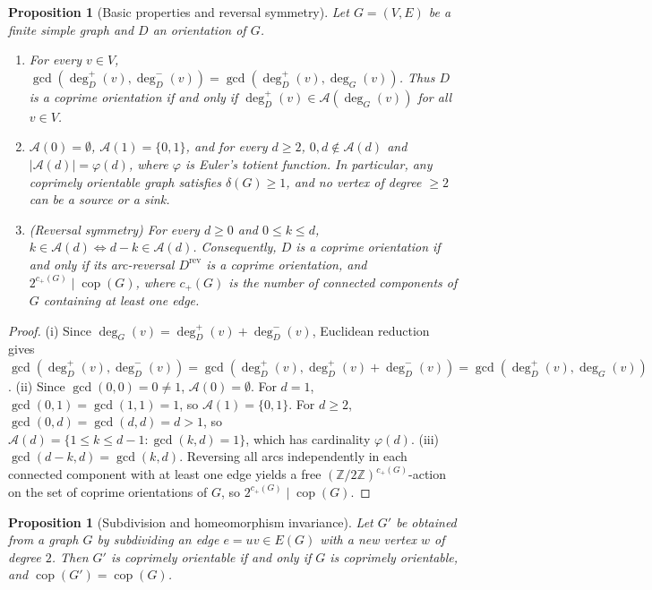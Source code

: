 \documentclass[11pt,a4paper]{article}
\newtheorem{proposition}[theorem]{Proposition}
\theoremstyle{definition}
\theoremstyle{remark}
\newcommand{\Z}{\mathbb{Z}}
\newcommand{\cop}{\operatorname{cop}}
\newcommand{\outdeg}{\deg^{+}}
\newcommand{\indeg}{\deg^{-}}
\newcommand{\Aset}{\mathcal{A}}
\begin{document}
\begin{proposition}[Basic properties and reversal symmetry]\label{prop:basic}
Let $G = (V, E)$ be a finite simple graph and $D$ an orientation of $G$.
\begin{enumerate}[label=(\roman*)]
  \item For every $v \in V$, $\gcd(\outdeg_D(v), \indeg_D(v)) = \gcd(\outdeg_D(v), \deg_G(v))$. Thus $D$ is a coprime orientation if and only if $\outdeg_D(v) \in \Aset(\deg_G(v))$ for all $v \in V$.
  \item $\Aset(0) = \emptyset$, $\Aset(1) = \{0, 1\}$, and for every $d \ge 2$, $0, d \notin \Aset(d)$ and $|\Aset(d)| = \varphi(d)$, where $\varphi$ is Euler's totient function. In particular, any coprimely orientable graph satisfies $\delta(G) \ge 1$, and no vertex of degree $\ge 2$ can be a source or a sink.
  \item (\emph{Reversal symmetry}) For every $d \ge 0$ and $0 \le k \le d$, $k \in \Aset(d) \iff d - k \in \Aset(d)$. Consequently, $D$ is a coprime orientation if and only if its arc-reversal $D^{\mathrm{rev}}$ is a coprime orientation, and $2^{c_+(G)} \mid \cop(G)$, where $c_+(G)$ is the number of connected components of $G$ containing at least one edge.
\end{enumerate}
\end{proposition}

\begin{proof}
(i) Since $\deg_G(v) = \outdeg_D(v) + \indeg_D(v)$, Euclidean reduction gives $\gcd(\outdeg_D(v), \indeg_D(v)) = \gcd(\outdeg_D(v), \outdeg_D(v) + \indeg_D(v)) = \gcd(\outdeg_D(v), \deg_G(v))$.
(ii) Since $\gcd(0, 0) = 0 \neq 1$, $\Aset(0) = \emptyset$. For $d = 1$, $\gcd(0, 1) = \gcd(1, 1) = 1$, so $\Aset(1) = \{0, 1\}$. For $d \ge 2$, $\gcd(0, d) = \gcd(d, d) = d > 1$, so $\Aset(d) = \{1 \le k \le d - 1 : \gcd(k, d) = 1\}$, which has cardinality $\varphi(d)$.
(iii) $\gcd(d - k, d) = \gcd(k, d)$. Reversing all arcs independently in each connected component with at least one edge yields a free $(\Z/2\Z)^{c_+(G)}$-action on the set of coprime orientations of $G$, so $2^{c_+(G)} \mid \cop(G)$.
\end{proof}

\begin{proposition}[Subdivision and homeomorphism invariance]\label{prop:subdiv}
Let $G'$ be obtained from a graph $G$ by subdividing an edge $e = uv \in E(G)$ with a new vertex $w$ of degree $2$. Then $G'$ is coprimely orientable if and only if $G$ is coprimely orientable, and $\cop(G') = \cop(G)$.
\end{proposition}
\end{document}
